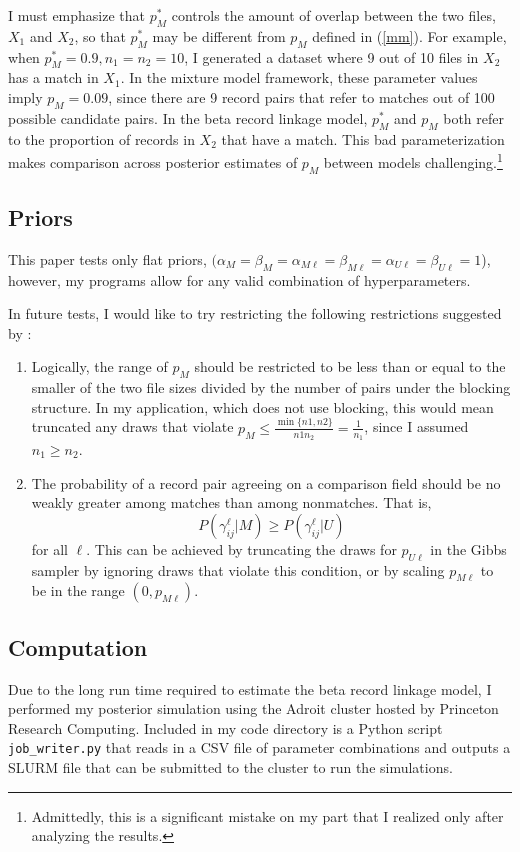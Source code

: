 \documentclass[11pt,reqno]{amsart}
\begin{document}
I must emphasize that $p_M^*$ controls the amount of overlap between the two files, $X_1$ and $X_2$, so that $p_M^*$ may be different from $p_M$ defined in  (\ref{mm}).  For example, when $p_M^* = 0.9, n_1=n_2 = 10$, I generated a dataset where 9 out of 10 files in $X_2$ has a match in $X_1$.  In the mixture model framework, these parameter values imply $p_M = 0.09$, since there are 9 record pairs that refer to matches out of 100 possible candidate pairs.  In the beta record linkage model, $p_M^*$ and $p_M$ both refer to the proportion of records in $X_2$ that have a match.  This bad parameterization makes comparison across posterior estimates of $p_M$ between models challenging.\footnote{Admittedly, this is a significant mistake on my part that I realized only after analyzing the results.}




\subsection{Priors} This paper tests only flat priors, $(\alpha_M=\beta_M=\alpha_{M\ell}=\beta_{M\ell}=\alpha_{U\ell}=\beta_{U\ell}=1$), however, my programs allow for any valid combination of hyperparameters.  

In future tests, I would like to try restricting the following restrictions suggested by \cite{larsen_2005}:
\begin{enumerate}
\item Logically, the range of $p_M$ should be restricted to be less than or equal to the smaller of the two file sizes divided by the number of pairs under the blocking structure.  In my application, which does not use blocking, this would mean truncated any draws that violate $p_M \leq \frac{\min\{n1,n2\}}{n1n_2} = \frac{1}{n_1}$, since I assumed $n_1 \geq n_2$. 
\item The probability of a record pair agreeing on a comparison field should be no weakly greater among matches than among nonmatches.  That is, $$P(\gamma_{ij}^{\ell} | M) \geq P(\gamma_{ij}^{\ell} | U)$$ for all $\ell$.  This can be achieved by truncating the draws for $p_{U\ell}$ in the Gibbs sampler by ignoring draws that violate this condition, or by scaling $p_{M\ell}$ to be in the range $(0, p_{M\ell})$. 
\end{enumerate}

\subsection{Computation} Due to the long run time required to estimate the beta record linkage model, I performed my posterior simulation using the Adroit cluster hosted by Princeton Research Computing.   Included in my code directory is a Python script \texttt{job\_writer.py} that reads in a CSV file of parameter combinations and outputs a SLURM file that can be submitted to the cluster to run the simulations.  
\end{document}
